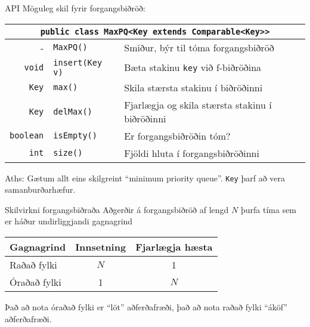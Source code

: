 \documentclass[handout]{beamer}
\begin{document}
\begin{frame}{API}
	Möguleg skil fyrir forgangsbiðröð:
	\begin{center}
		\begin{tabularx}{\textwidth}{rlX}
			\toprule
			\multicolumn{3}{c}{\texttt{public class MaxPQ<Key extends Comparable<Key>>}}                \\
			\midrule
			-                & \texttt{MaxPQ()}       & Smiður, býr til tóma forgangsbiðröð             \\
			\texttt{void}    & \texttt{insert(Key v)} & Bæta stakinu \texttt{key} við f-biðröðina       \\
			\texttt{Key}     & \texttt{max()}         & Skila stærsta stakinu í biðröðinni              \\
			\texttt{Key}     & \texttt{delMax()}      & Fjarlægja og skila stærsta stakinu í biðröðinni \\
			\texttt{boolean} & \texttt{isEmpty()}     & Er forgangsbiðröðin tóm?                        \\
			\texttt{int}     & \texttt{size()}        & Fjöldi hluta í forgangsbiðröðinni               \\
			\bottomrule
		\end{tabularx}
	\end{center}
	Aths: Gætum allt eins skilgreint ``minimum priority queue''. \texttt{Key} þarf að vera samanburðarhæfur.
\end{frame}

\begin{frame}{Skilvirkni forgangsbiðraða}
	Aðgerðir á forgangsbiðröð af lengd $N$ þurfa tíma sem er háður undirliggjandi gagnagrind
	\begin{center}
		\begin{tabular}{lcc}
			\toprule
			Gagnagrind   & Innsetning & Fjarlægja hæsta \\
			\midrule
			Raðað fylki  & $N$        & 1               \\
			Óraðað fylki & 1          & $N$             \\
			\bottomrule
		\end{tabular}
	\end{center}
	Það að nota óraðað fylki er ``löt'' aðferðafræði, það að nota raðað fylki ``áköf'' aðferðafræði.
\end{frame}

\end{document}
